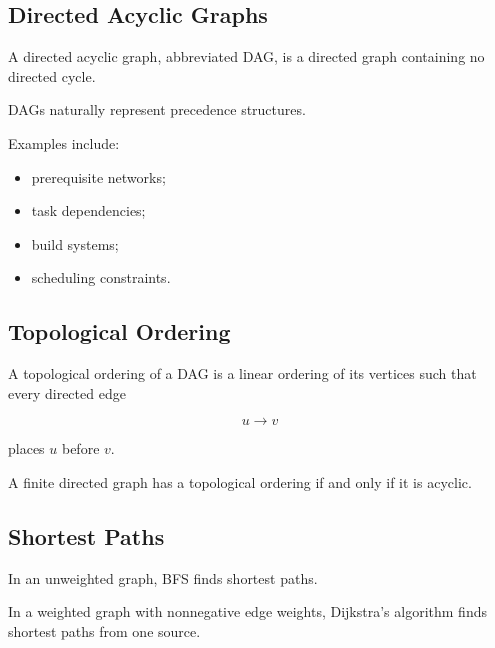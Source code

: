 \subsection{Directed Acyclic Graphs}
\label{subsec:directed-acyclic-graphs}

A directed acyclic graph, abbreviated DAG, is a directed graph containing
no directed cycle.

DAGs naturally represent precedence structures.

Examples include:

\begin{itemize}
    \item prerequisite networks;
    \item task dependencies;
    \item build systems;
    \item scheduling constraints.
\end{itemize}

\subsection{Topological Ordering}
\label{subsec:topological-ordering}

A topological ordering of a DAG is a linear ordering of its vertices
such that every directed edge

\[
u\to v
\]

places \(u\) before \(v\).

\begin{theorem}
A finite directed graph has a topological ordering if and only if it is
acyclic.
\end{theorem}

\subsection{Shortest Paths}
\label{subsec:shortest-paths}

In an unweighted graph, BFS finds shortest paths.

In a weighted graph with nonnegative edge weights, Dijkstra's algorithm
finds shortest paths from one source.

